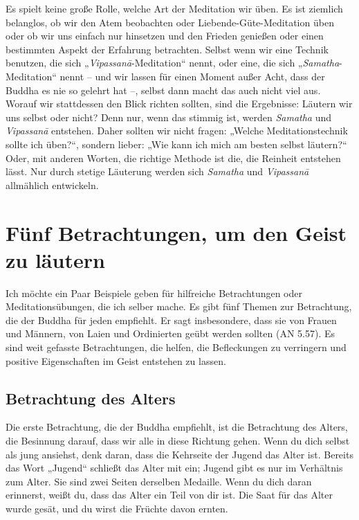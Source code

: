 \documentclass[12pt,openany]{book}
\begin{document}
Es spielt keine große Rolle, welche Art der Meditation wir üben. Es ist ziemlich belanglos, ob wir den Atem beobachten oder Liebende-Güte-Meditation üben oder ob wir uns einfach nur hinsetzen und den Frieden genießen oder einen bestimmten Aspekt der Erfahrung betrachten. Selbst wenn wir eine Technik benutzen, die sich „\textit{Vipas\-sanā}-Meditation“ nennt, oder eine, die sich „\textit{Samatha}-Meditation“ nennt – und wir lassen für einen Moment außer Acht, dass der Buddha es nie so gelehrt hat –, selbst dann macht das auch nicht viel aus. Worauf wir stattdessen den Blick richten sollten, sind die Ergebnisse: Läutern wir uns selbst oder nicht? Denn nur, wenn das stimmig ist, werden \textit{Samatha} und \textit{Vipas\-sanā} entstehen. Daher sollten wir nicht fragen: „Welche Meditationstechnik sollte ich üben?“, sondern lieber: „Wie kann ich mich am besten selbst läutern?“ Oder, mit anderen Worten, die richtige Methode ist die, die Reinheit entstehen lässt. Nur durch stetige Läuterung werden sich \textit{Samatha} und \textit{Vipas\-sanā} allmählich entwickeln.


\chapter*{Fünf Betrachtungen, um den Geist zu läutern}


Ich möchte ein Paar Beispiele geben für hilfreiche Betrachtungen oder Meditationsübungen, die ich selber mache. Es gibt fünf Themen zur Betrachtung, die der Buddha für jeden empfiehlt. Er sagt insbesondere, dass sie von Frauen und Männern, von Laien und Ordinierten geübt werden sollten (AN 5.57). Es sind weit gefasste Betrachtungen, die helfen, die Befleckungen zu verringern und positive Eigenschaften im Geist entstehen zu lassen.

\section*{Betrachtung des Alters}

Die erste Betrachtung, die der Buddha empfiehlt, ist die Betrachtung des Alters, die Besinnung darauf, dass wir alle in diese Richtung gehen. Wenn du dich selbst als jung ansiehst, denk daran, dass die Kehrseite der Jugend das Alter ist. Bereits das Wort „Jugend“ schließt das Alter mit ein; Jugend gibt es nur im Verhältnis zum Alter. Sie sind zwei Seiten derselben Medaille. Wenn du dich daran erinnerst, weißt du, dass das Alter ein Teil von dir ist. Die Saat für das Alter wurde gesät, und du wirst die Früchte davon ernten.
\end{document}
